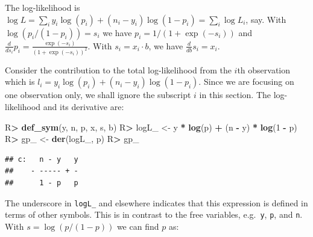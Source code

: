 \documentclass[10pt,]{article}
\newenvironment{Shaded}{\begin{snugshade}}{\end{snugshade}}
\newcommand{\DecValTok}[1]{\textcolor[rgb]{0.00,0.00,0.81}{#1}}
\newcommand{\KeywordTok}[1]{\textcolor[rgb]{0.13,0.29,0.53}{\textbf{#1}}}
\newcommand{\NormalTok}[1]{#1}
\newcommand{\OperatorTok}[1]{\textcolor[rgb]{0.81,0.36,0.00}{\textbf{#1}}}
\newcommand{\StringTok}[1]{\textcolor[rgb]{0.31,0.60,0.02}{#1}}
\begin{document}
The log-likelihood is
\(\log L=\sum_i y_i \log(p_i) + (n_i-y_i) \log(1-p_i) = \sum_i \log L_i\),
say. With \(\log(p_i/(1-p_i)) = s_i\) we have
\(p_i=1 / (1+ \exp(-s_i))\) and
\(\frac d {ds_i} p_i = \frac{\exp(- s_i)}{\left(1 + \exp(- s_i)\right)^{2}}\).
With \(s_i = x_i\cdot b\), we have \(\frac d {db} s_i = x_i\).

Consider the contribution to the total log-likelihood from the \(i\)th
observation which is \(l_i = y_i \log(p_i) + (n_i-y_i) \log(1-p_i)\).
Since we are focusing on one observation only, we shall ignore the
subscript \(i\) in this section. The log-likelihood and its derivative
are:

\begin{Shaded}
\begin{Highlighting}[]
\NormalTok{R}\OperatorTok{>}\StringTok{ }\KeywordTok{def_sym}\NormalTok{(y, n, p, x, s, b)}
\NormalTok{R}\OperatorTok{>}\StringTok{ }\NormalTok{logL_ <-}\StringTok{ }\NormalTok{y }\OperatorTok{*}\StringTok{ }\KeywordTok{log}\NormalTok{(p) }\OperatorTok{+}\StringTok{ }\NormalTok{(n }\OperatorTok{-}\StringTok{ }\NormalTok{y) }\OperatorTok{*}\StringTok{ }\KeywordTok{log}\NormalTok{(}\DecValTok{1} \OperatorTok{-}\StringTok{ }\NormalTok{p)}
\NormalTok{R}\OperatorTok{>}\StringTok{ }\NormalTok{gp_ <-}\StringTok{ }\KeywordTok{der}\NormalTok{(logL_, p)}
\NormalTok{R}\OperatorTok{>}\StringTok{ }\NormalTok{gp_}
\end{Highlighting}
\end{Shaded}

\begin{verbatim}
## c:   n - y   y
##    - ----- + -
##      1 - p   p
\end{verbatim}

The underscore in \texttt{logL\_} and elsewhere indicates that this
expression is defined in terms of other symbols. This is in contrast to
the free variables, e.g.~\texttt{y}, \texttt{p}, and \texttt{n}. With
\(s = \log(p/(1-p))\) we can find \(p\) as:

\begin{Shaded}
\end{Shaded}
\end{document}
